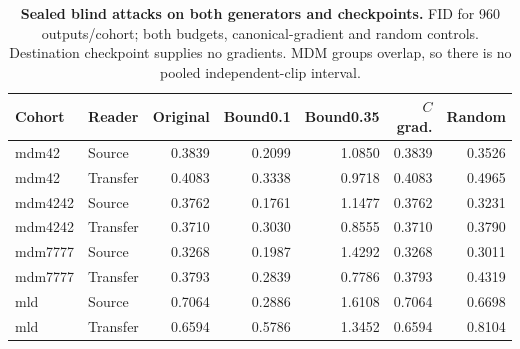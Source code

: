 \begin{table}[t]
\centering\footnotesize
\caption{\textbf{Sealed blind attacks on both generators and checkpoints.} FID for 960 outputs/cohort; both budgets, canonical-gradient and random controls. Destination checkpoint supplies no gradients. MDM groups overlap, so there is no pooled independent-clip interval.}\label{tab:blindtransfer}
\begin{tabular}{@{}llrrrrr@{}}\toprule
Cohort&Reader&Original&Bound0.1&Bound0.35&$C$ grad.&Random\\\midrule
mdm42&Source&0.3839&0.2099&1.0850&0.3839&0.3526\\
mdm42&Transfer&0.4083&0.3338&0.9718&0.4083&0.4965\\
mdm4242&Source&0.3762&0.1761&1.1477&0.3762&0.3231\\
mdm4242&Transfer&0.3710&0.3030&0.8555&0.3710&0.3790\\
mdm7777&Source&0.3268&0.1987&1.4292&0.3268&0.3011\\
mdm7777&Transfer&0.3793&0.2839&0.7786&0.3793&0.4319\\
mld&Source&0.7064&0.2886&1.6108&0.7064&0.6698\\
mld&Transfer&0.6594&0.5786&1.3452&0.6594&0.8104\\
\bottomrule\end{tabular}\end{table}
